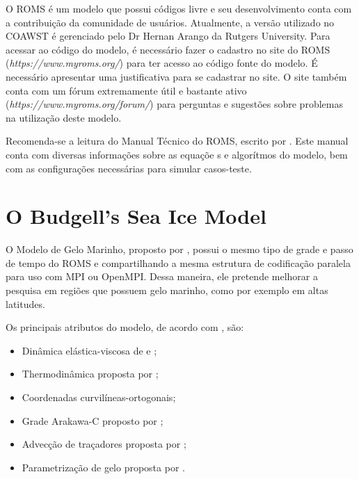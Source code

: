 \noindent O ROMS é um modelo que possui códigos livre e seu desenvolvimento conta com a contribuição da comunidade de usuários. Atualmente, a versão utilizado no COAWST é gerenciado pelo Dr Hernan Arango da Rutgers University. Para acessar ao código do modelo, é necessário fazer o cadastro no site do ROMS (\textcolor{bleu_cite}{\textit{https://www.myroms.org/}}) para ter acesso ao código fonte do modelo. É necessário apresentar uma justificativa para se cadastrar no site. O site também conta com um fórum extremamente útil e bastante ativo (\textcolor{bleu_cite}{\textit{https://www.myroms.org/forum/}}) para perguntas e sugestões sobre problemas na utilização deste modelo.
\bigskip

\noindent Recomenda-se a leitura do Manual Técnico do ROMS, escrito por \textcite{hedstrom2018}. Este manual conta com diversas informações sobre as equaçõe s e algorítmos do modelo, bem com as configurações necessárias para simular casos-teste. 



\section{O Budgell's Sea Ice Model}
\bigskip

\noindent O Modelo de Gelo Marinho, proposto por \textcite{Budgell2005}, possui o mesmo tipo de grade e passo de tempo do ROMS e compartilhando a mesma estrutura de codificação paralela para uso com MPI ou OpenMPI. Dessa maneira, ele pretende melhorar a pesquisa em regiões que possuem gelo marinho, como por exemplo em altas latitudes. 
\bigskip

\noindent Os principais atributos do modelo, de acordo com \textcite{hedstrom2018}, são:
\bigskip
\begin{itemize}
    \item Dinâmica elástica-viscosa de \textcite{Hunke1997} e \textcite{Hunke2001};
    \item Thermodinâmica proposta por \textcite{Mellor1989};
    \item Coordenadas curvilíneas-ortogonais;
    \item Grade Arakawa-C proposto  por \textcite{Arakawa1977};
    \item Advecção de traçadores proposta por \textcite{Smolarkiewicz1990};
    \item Parametrização de gelo proposta por \textcite{Lemieux2015}.
\end{itemize}
\bigskip


